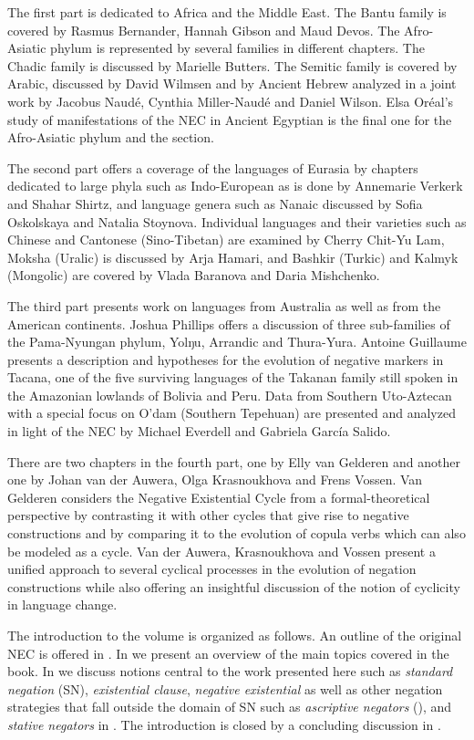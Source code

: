 \documentclass[output=paper,chinesefont,colorlinks,citecolor=brown]{langscibook}
\begin{document}
The first part is dedicated to Africa and the Middle East. The Bantu family is covered by Rasmus Bernander, Hannah Gibson and Maud Devos. The Afro-Asiatic phylum is represented by several families in different chapters. The Chadic family is discussed by Marielle Butters. The Semitic family is covered by Arabic, discussed by David Wilmsen and by Ancient Hebrew analyzed in a joint work by Jacobus Naudé, Cynthia Miller-Naudé and Daniel Wilson. Elsa Oréal's study of manifestations of the NEC in Ancient Egyptian is the final one for the Afro-Asiatic phylum and the section. 

The second part offers a coverage of the languages of Eurasia by chapters dedicated to large phyla such as Indo-European as is done by Annemarie Verkerk and Shahar Shirtz, and language genera such as Nanaic discussed by Sofia Oskolskaya and Natalia Stoynova. Individual languages and their varieties such as Chinese and Cantonese (Sino-Tibetan) are examined by Cherry Chit-Yu Lam, Moksha (Uralic) is discussed by Arja Hamari, and Bashkir (Turkic) and Kalmyk (Mongolic) are covered by Vlada Baranova and Daria Mishchenko. 

The third part presents work on languages from Australia as well as from the American continents. Joshua Phillips offers a discussion of three sub-families of the Pama-Nyungan phylum, Yolŋu, Arrandic and Thura-Yura. Antoine Guillaume presents a description and hypotheses for the evolution of negative markers in Tacana, one of the five surviving languages of the Takanan family still spoken in the Amazonian lowlands of Bolivia and Peru. Data from Southern Uto-Aztecan with a special focus on O’dam (Southern Tepehuan) are presented and analyzed in light of the NEC by Michael Everdell and Gabriela García Salido.

There are two chapters in the fourth part, one by Elly van Gelderen and another one by Johan van der Auwera, Olga Krasnoukhova and Frens Vossen. Van Gelderen considers the Negative Existential Cycle from a formal-theoretical perspective by contrasting it with other cycles that give rise to negative constructions and by comparing it to the evolution of copula verbs which can also be modeled as a cycle. Van der Auwera, Krasnoukhova and Vossen present a unified approach to several cyclical processes in the evolution of negation constructions while also offering an insightful discussion of the notion of cyclicity in language change. 

The introduction to the volume is organized as follows. An outline of the original NEC is offered in . In  we present
an overview of the main topics covered in the book. In   we
discuss notions central to the work presented here such as \textit{standard negation} (SN), \textit{existential
clause}, \textit{negative existential} as well as other negation strategies that fall outside
the domain of SN such as \textit{ascriptive negators} (), and \textit{stative negators} in .
 The introduction is closed by a concluding
discussion in .
\end{document}
